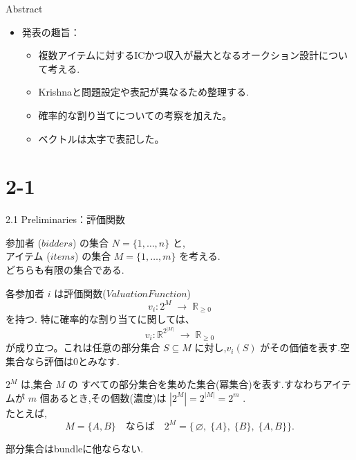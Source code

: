 \documentclass[dvipdfmx,autodetect-engine]{beamer}
\title{\papertitle}
\author{\paperauthor}
\institute{\paperaffil}
\date{\paperdate}
\begin{document}
\begin{frame}
  \titlepage
\end{frame}

\begin{frame}{Abstract}
  \small
  \begin{itemize}
    \item 発表の趣旨：
    \begin{itemize}
      \item 複数アイテムに対するICかつ収入が最大となるオークション設計について考える.
      \item Krishnaと問題設定や表記が異なるため整理する.
      \item 確率的な割り当てについての考察を加えた。
      \item ベクトルは太字で表記した。
    \end{itemize}
\end{itemize}
\end{frame}

\section{2-1}
\begin{frame}{2.1  Preliminaries：評価関数}
  \small
  \begin{itemize}
    \item 参加者 ($bidders$) の集合 $N = \{1, \ldots, n\}$ と,\\
          アイテム ($items$) の集合 $M = \{1, \ldots, m\}$ を考える.\\
          どちらも有限の集合である.
    {\small
    \item 各参加者 $i$ は評価関数($Valuation Function$)  
      \[
        v_i: 2^M \;\rightarrow\;\mathbb{R}_{\ge0}
      \]
      を持つ.
      特に確率的な割り当てに関しては、
      \[
        v_i: \mathbb{R}^{2^{|M|}} \;\rightarrow\;\mathbb{R}_{\ge0}
      \]
      が成り立つ。これは任意の部分集合 $S \subseteq M$ に対し,$v_i(S)$ がその価値を表す.空集合なら評価は0とみなす.
    \item [補足1]$2^M$ は,集合 $M$ の すべての部分集合を集めた集合(冪集合)を表す.すなわちアイテムが $m$ 個あるとき,その個数(濃度)は $|2^M|= 2^{\lvert M \rvert} = 2^m$ .\\
    たとえば,
    \[
    M=\{A,B\}
    \quad\text{ならば}\quad
    2^{M}= \bigl\{\,\varnothing,\;\{A\},\;\{B\},\;\{A,B\}\bigr\}.
    \]
    \item [補足2]部分集合はbundleに他ならない.}
  \end{itemize}
\end{frame}
\end{document}
